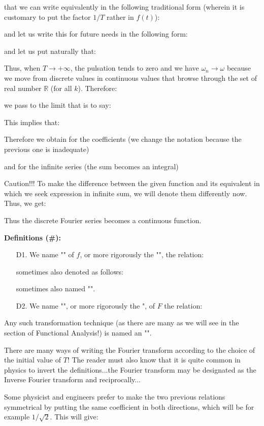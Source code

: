 	that we can write equivalently in the following traditional form (wherein it is customary to put the factor $1/T$ rather in $f(t)$):
	
	and let us write this for future needs in the following form:
	
	and let us put naturally that:
	
	Thus, when $T\rightarrow +\infty$, the pulsation tends to zero and we have $\omega_n\rightarrow \omega$ because we move from discrete values in continuous values that browse through the set of real number $\mathbb{R}$ (for all $k$). Therefore:
	
	we pass to the limit that is to say:
	
	This implies that:
	
	Therefore we obtain for the coefficients (we change the notation because the previous one is inadequate)
	
	and for the infinite series (the sum becomes an integral)
	
	Caution!!! To make the difference between the given function and its equivalent in which we seek expression in infinite sum, we will denote them differently now. Thus, we get:
	
	Thus the discrete Fourier series becomes a continuous function.
	
	\textbf{Definitions (\#\mydef):}
	\begin{enumerate}
		\item[D1.] We name "" of $f$, or more rigorously the "", the relation:
		
		sometimes also denoted as follows:
		
		sometimes also named "".
		
		\item[D2.] We name "", or more rigorously the ",  of $F$ the relation:
		
	\end{enumerate}
	Any such transformation technique (as there are many as we will see in the section of Functional Analysis!) is named an "".
	\begin{tcolorbox}[title=Remark,colframe=black,arc=10pt]
	There are many ways of writing the Fourier transform according to the choice of the initial value of $T$! The reader must also know that it is quite common in physics to invert the definitions...the Fourier transform may be designated as the Inverse Fourier transform and reciprocally...
	\end{tcolorbox}
	Some physicist and engineers prefer to make the two previous relations symmetrical by putting the same coefficient in both directions, which will be for example $1/\sqrt{2}$. This will give:	
	
